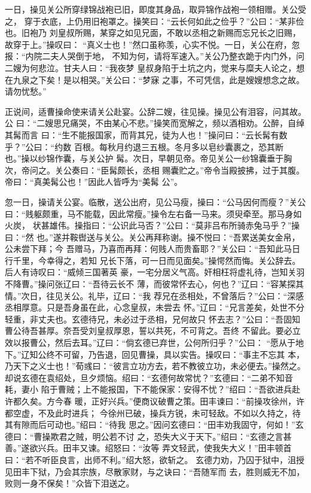 一日，操见关公所穿绿锦战袍已旧，即度其身品，取异锦作战袍一领相赠。关公受之，
穿于衣底，上仍用旧袍罩之。操笑曰：“云长何如此之俭乎？”公曰：“某非俭也。旧袍乃
刘皇叔所赐，某穿之如见兄面，不敢以丞相之新赐而忘兄长之旧赐，故穿于上。”操叹曰：
“真义士也！”然口虽称羡，心实不悦。一日，关公在府，忽报：“内院二夫人哭倒于地，
不知为何，请将军速入。”关公乃整衣跪于内门外，问二嫂为何悲泣。甘夫人曰：“我夜梦
皇叔身陷于土坑之内，觉来与糜夫人论之，想在九泉之下矣！是以相哭。”关公曰：“梦寐
之事，不可凭信，此是嫂嫂想念之故。请勿忧愁。”

正说间，适曹操命使来请关公赴宴。公辞二嫂，往见操。操见公有泪容，问其故。公
曰：“二嫂思兄痛哭，不由某心不悲。”操笑而宽解之，频以酒相劝。公醉，自绰其髯而言
曰：“生不能报国家，而背其兄，徒为人也！”操问曰：“云长髯有数乎？”公曰：“约数
百根。每秋月约退三五根。冬月多以皂纱囊裹之，恐其断也。”操以纱锦作囊，与关公护
髯。次日，早朝见帝。帝见关公一纱锦囊垂于胸次，帝问之。关公奏曰：“臣髯颇长，丞相
赐囊贮之。”帝令当殿披拂，过于其腹。帝曰：“真美髯公也！”因此人皆呼为“美髯
公”。

忽一日，操请关公宴。临散，送公出府，见公马瘦，操曰：“公马因何而瘦？”关公
曰：“贱躯颇重，马不能载，因此常瘦。”操令左右备一马来。须臾牵至。那马身如火炭，
状甚雄伟。操指曰：“公识此马否？”公曰：“莫非吕布所骑赤兔马乎？”操曰：“然
也。”遂并鞍辔送与关公。关公再拜称谢。操不悦曰：“吾累送美女金帛，公未尝下拜；今
吾赠马，乃喜而再拜：何贱人而贵畜耶？”关公曰：“吾知此马日行千里，今幸得之，若知
兄长下落，可一日而见面矣。”操愕然而悔。关公辞去。后人有诗叹曰：“威倾三国著英
豪，一宅分居义气高。奸相枉将虚礼待，岂知关羽不降曹。”操问张辽曰：“吾待云长不
薄，而彼常怀去心，何也？”辽曰：“容某探其情。”次日，往见关公。礼毕，辽曰：“我
荐兄在丞相处，不曾落后？”公曰：“深感丞相厚意。只是吾身虽在此，心念皇叔，未尝去
怀。”辽曰：“兄言差矣，处世不分轻重，非丈夫也。玄德待兄，未必过于丞相，兄何故只
怀去志？”公曰：“吾固知曹公待吾甚厚。奈吾受刘皇叔厚恩，誓以共死，不可背之。吾终
不留此。要必立效以报曹公，然后去耳。”辽曰：“倘玄德已弃世，公何所归乎？”公曰：
“愿从于地下。”辽知公终不可留，乃告退，回见曹操，具以实告。操叹曰：“事主不忘其
本，乃天下之义士也！”荀彧曰：“彼言立功方去，若不教彼立功，未必便去。”操然之。
却说玄德在袁绍处，旦夕烦恼。绍曰：“玄德何故常忧？”玄德曰：“二弟不知音耗，妻小
陷于曹贼；上不能报国，下不能保家：安得不忧？”绍曰：“吾欲进兵赴许都久矣。方今春
暖，正好兴兵。”便商议破曹之策。田丰谏曰：“前操攻徐州，许都空虚，不及此时进兵；
今徐州已破，操兵方锐，未可轻敌。不如以久持之，待其有隙而后可动也。”绍曰：“待我
思之。”因问玄德曰：“田丰劝我固守，何如！”玄德曰：“曹操欺君之贼，明公若不讨
之，恐失大义于天下。”绍曰：“玄德之言甚善。”遂欲兴兵。田丰又谏。绍怒曰：“汝等
弄文轻武，使我失大义！”田丰顿首曰：“若不听臣良言，出师不利。”绍大怒，欲斩之。
玄德力劝，乃囚于狱中，沮授见田丰下狱，乃会其宗族，尽散家财，与之诀曰：“吾随军而
去，胜则威无不加，败则一身不保矣！”众皆下泪送之。

